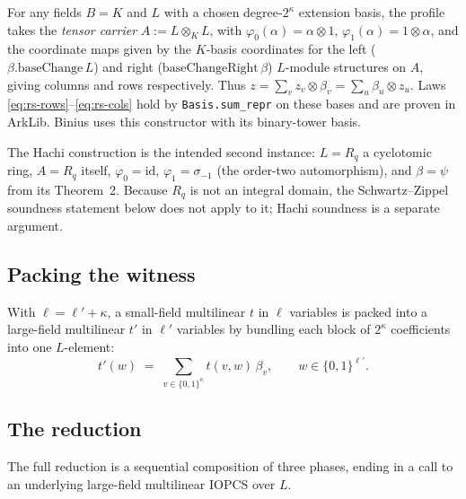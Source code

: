 \begin{definition}
  \label{def:tensor_product_profile}
  For any fields $B = K$ and $L$ with a chosen degree-$2^\kappa$ extension basis, the profile takes the
  \emph{tensor carrier} $A := L \otimes_K L$, with $\varphi_0(\alpha) = \alpha \otimes 1$,
  $\varphi_1(\alpha) = 1 \otimes \alpha$, and the coordinate maps given by the $K$-basis coordinates
  for the left ($\beta.\mathrm{baseChange}\,L$) and right ($\mathrm{baseChangeRight}\,\beta$)
  $L$-module structures on $A$, giving columns and rows respectively. Thus
  $z = \sum_v z_v \otimes \beta_v = \sum_u \beta_u \otimes z_u$. Laws \eqref{eq:rs-rows}--\eqref{eq:rs-cols} hold by
  \texttt{Basis.sum\_repr} on these bases and are proven in ArkLib. Binius uses this constructor
  with its binary-tower basis.
\end{definition}

The Hachi construction \cite{NOZ26} is the intended second instance: $L = R_q$ a cyclotomic ring,
$A = R_q$ itself, $\varphi_0 = \mathrm{id}$, $\varphi_1 = \sigma_{-1}$ (the order-two automorphism),
and $\beta = \psi$ from its Theorem~2. Because $R_q$ is not an integral domain, the Schwartz--Zippel
soundness statement below does not apply to it; Hachi soundness is a separate argument.

\subsection{Packing the witness}

\begin{definition}
  \label{def:pack_mle}
  With $\ell = \ell' + \kappa$, a small-field multilinear $t$ in $\ell$ variables is packed into a
  large-field multilinear $t'$ in $\ell'$ variables by bundling each block of $2^\kappa$ coefficients
  into one $L$-element:
  \[
    t'(w) \;=\; \sum_{v \in \{0,1\}^\kappa} t(v, w)\,\beta_v, \qquad w \in \{0,1\}^{\ell'}.
  \]
\end{definition}

\subsection{The reduction}

The full reduction is a sequential composition of three phases, ending in a call to an underlying
large-field multilinear IOPCS over $L$.

